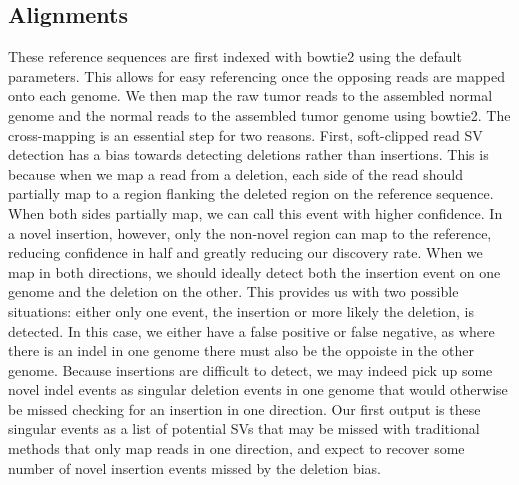 \documentclass{easychithesis}
\begin{document}
\subsection{Alignments}
These reference sequences are first indexed with bowtie2 \cite{langmead2012fast} using the default parameters. This allows for easy referencing once the opposing reads are mapped onto each genome. We then map the raw tumor reads to the assembled normal genome and the normal reads to the assembled tumor genome using bowtie2. The cross-mapping is an essential step for two reasons. First, soft-clipped read SV detection has a bias towards detecting deletions rather than insertions. This is because when we map a read from a deletion, each side of the read should partially map to a region flanking the deleted region on the reference sequence. When both sides partially map, we can call this event with higher confidence. In a novel insertion, however, only the non-novel region can map to the reference, reducing confidence in half and greatly reducing our discovery rate. When we map in both directions, we should ideally detect both the insertion event on one genome and the deletion on the other. This provides us with two possible situations: either only one event, the insertion or more likely the deletion, is detected. In this case, we either have a false positive or false negative, as where there is an indel in one genome there must also be the oppoiste in the other genome. Because insertions are difficult to detect, we may indeed pick up some novel indel events as singular deletion events in one genome that would otherwise be missed checking for an insertion in one direction. Our first output is these singular events as a list of potential SVs that may be missed with traditional methods that only map reads in one direction, and expect to recover some number of novel insertion events missed by the deletion bias.
\end{document}
